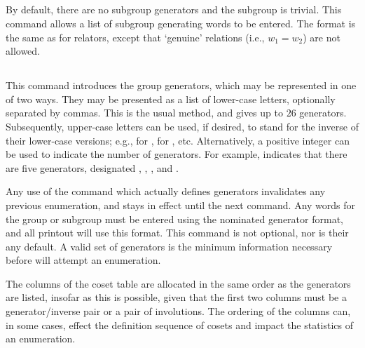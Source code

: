 \subsection{}
\label{cmd:generators}
\label{cmd:subgroup generators}

By default, there are no subgroup generators and the subgroup is trivial.
This command allows a list of subgroup generating words to be entered.
The format is the same as for relators, except that `genuine' relations
  (i.e., $w_1 = w_2$) are not allowed.

\subsection{}
\label{cmd:gr}
\label{cmd:group generators}

This command introduces the group generators, which may be represented in
  one of two ways.
They may be presented as a list of lower-case letters, optionally
  separated by commas.
This is the usual method, and gives up to $26$ generators.
Subsequently, upper-case letters can be used, if desired, to stand for the
  inverse of their lower-case versions; 
  e.g.,  for ,  for , etc.
Alternatively, a positive integer can be used to indicate the number of
  generators.
For example,  indicates that there are five generators, 
  designated \ttt{1}, \ttt{2}, \ttt{3}, \ttt{4} and \ttt{5}.

Any use of the  command which actually defines generators
  invalidates any previous enumeration, and stays in effect until the next
  \ttt{gr} command.
Any words for the group or subgroup must be entered using the nominated
  generator format, and all printout will use this format.
%
This command is not optional, nor is their any default.
A valid set of generators is the minimum information necessary before
  {\ace} will attempt an enumeration.

The columns of the coset table are allocated in the same order as the 
  generators are listed, insofar as this is possible, given that the first
  two columns must be a generator/inverse pair or a pair of involutions.
The ordering of the columns can, in some cases, effect the definition
  sequence of cosets and impact the statistics of an enumeration.

\subsection{}
\label{cmd:relators}
\label{cmd:group relators}

